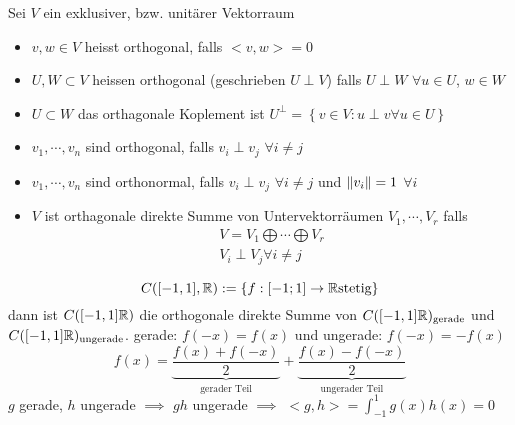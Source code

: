 \begin{Def}
  Sei $V$ ein exklusiver, bzw. unitärer Vektorraum
  \begin{itemize}
    \item $v,w\in V$ heisst orthogonal, falls $<v,w>=0$
    \item $U,W\subset V$ heissen orthogonal (geschrieben $U\perp V$) falls $U\perp W$ $\forall u\in U$, $w\in W$
    \item $U\subset W$ das orthagonale Koplement ist $U^\perp=\left\{ v\in V: u\perp v \forall u\in U \right\}$
    \item $v_1,\cdots, v_n$ sind orthogonal, falls $v_i\perp v_j$ $\forall i\neq j$
    \item $v_1,\cdots, v_n$ sind orthonormal, falls $v_i\perp v_j$ $\forall i\neq j$ und $\left\| v_i \right\|=1$ $\forall i$
    \item $V$ ist orthagonale direkte Summe von Untervektorräumen $V_1,\cdots,V_r$ falls 
      \begin{align*}
        V=V_1\bigoplus \cdots \bigoplus V_r\\
        V_i\perp V_j \forall i\neq j
      \end{align*}
  \end{itemize}
  \[C([-1,1],\mathbb{R}):=\left\{ f:[-1;1]\to \mathbb{R} \text{stetig} \right\}\]
  dann ist $C([-1,1]\mathbb{R})$ die orthogonale direkte Summe von $C([-1,1]\mathbb{R})_\text{gerade}$ und $C([-1,1]\mathbb{R})_\text{ungerade}$. gerade: $f(-x)=f(x)$ und ungerade: $f(-x)=-f(x)$
  \[f(x)=\underbrace{\frac{f(x)+f(-x)}{2}}_\text{gerader Teil} + \underbrace{\frac{f(x)-f(-x)}{2}}_\text{ungerader Teil}\]
  $g$ gerade, $h$ ungerade $\implies$ $gh$ ungerade $\implies$ $<g,h> = \int_{-1}^1g(x)h(x)=0$
\end{Def}
